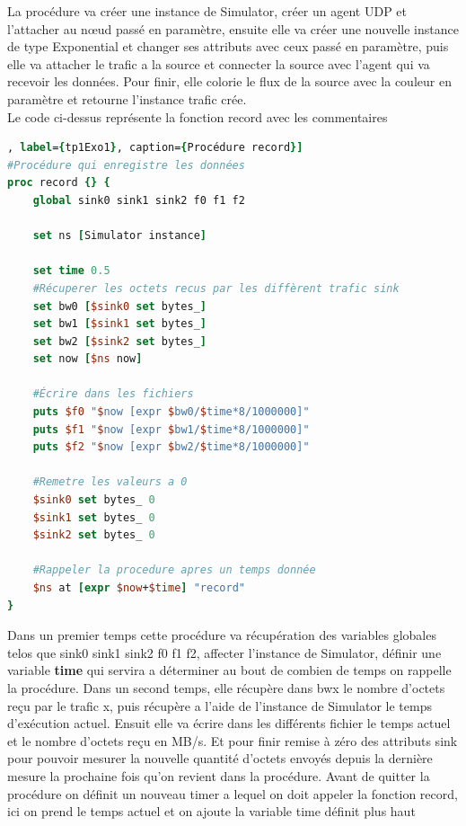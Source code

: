\documentclass[11pt]{article}
\begin{document}
La procédure va créer une instance de Simulator, créer un agent UDP et l'attacher au nœud passé en paramètre, ensuite elle va créer une nouvelle instance de type Exponential et changer ses attributs avec ceux passé en paramètre, puis elle va attacher le trafic a la source et connecter la source avec l'agent qui va recevoir les données. Pour finir, elle colorie le flux de la source avec la couleur en paramètre et retourne l'instance trafic crée.\\

Le code ci-dessus représente la fonction record avec les commentaires
\begin{lstlisting}[language=tcl,  numbers=none, framexleftmargin=0pt, 	framextopmargin=0pt, framexbottommargin=0pt], label={tp1Exo1}, caption={Procédure record}]
#Procédure qui enregistre les données
proc record {} {
	global sink0 sink1 sink2 f0 f1 f2

	set ns [Simulator instance]
	
	set time 0.5
	#Récuperer les octets recus par les diffèrent trafic sink
	set bw0 [$sink0 set bytes_]
	set bw1 [$sink1 set bytes_]
	set bw2 [$sink2 set bytes_]
	set now [$ns now]
	
	#Écrire dans les fichiers
	puts $f0 "$now [expr $bw0/$time*8/1000000]"
	puts $f1 "$now [expr $bw1/$time*8/1000000]"
	puts $f2 "$now [expr $bw2/$time*8/1000000]"
	
	#Remetre les valeurs a 0
	$sink0 set bytes_ 0
	$sink1 set bytes_ 0
	$sink2 set bytes_ 0
	
	#Rappeler la procedure apres un temps donnée
	$ns at [expr $now+$time] "record"
}
\end{lstlisting} 

Dans un premier temps cette procédure va récupération des variables globales telos que sink0 sink1 sink2 f0 f1 f2, affecter l'instance de Simulator, définir une variable \textbf{time} qui servira a déterminer au bout de combien de temps on rappelle la procédure. Dans un second temps, elle récupère  dans bwx le nombre d'octets reçu par le trafic x, puis récupère a l'aide de l'instance de Simulator le temps d’exécution actuel. Ensuit elle va écrire dans les différents fichier le temps actuel et le nombre d'octets reçu en MB/s. Et pour finir remise à zéro des attributs sink pour pouvoir mesurer la nouvelle quantité d’octets envoyés depuis la dernière mesure la prochaine fois qu'on revient dans la procédure. Avant de quitter la procédure on définit un nouveau timer a lequel on doit appeler la fonction record, ici on prend le temps actuel et on ajoute la variable time définit plus haut
\end{document}
